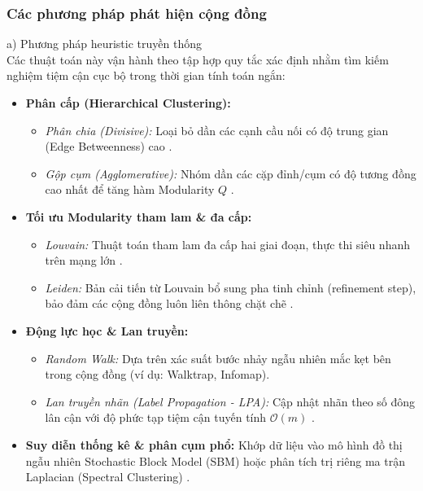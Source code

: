 \documentclass[14pt,a4paper]{extarticle}
\begin{document}
\subsubsection{Các phương pháp phát hiện cộng đồng}

\noindent a) Phương pháp heuristic truyền thống \\ \indent
Các thuật toán này vận hành theo tập hợp quy tắc xác định nhằm tìm kiếm nghiệm tiệm cận cục bộ trong thời gian tính toán ngắn:
\begin{itemize}
    \item \textbf{Phân cấp (Hierarchical Clustering):}
    \begin{itemize}
        \item \textit{Phân chia (Divisive):} Loại bỏ dần các cạnh cầu nối có độ trung gian (Edge Betweenness) cao \cite{Bedi2016}.
        \item \textit{Gộp cụm (Agglomerative):} Nhóm dần các cặp đỉnh/cụm có độ tương đồng cao nhất để tăng hàm Modularity $Q$ \cite{Traag2014}.
    \end{itemize}
    
    \item \textbf{Tối ưu Modularity tham lam \& đa cấp:}
    \begin{itemize}
        \item \textit{Louvain:} Thuật toán tham lam đa cấp hai giai đoạn, thực thi siêu nhanh trên mạng lớn \cite{Baraa2021}.
        \item \textit{Leiden:} Bản cải tiến từ Louvain bổ sung pha tinh chỉnh (refinement step), bảo đảm các cộng đồng luôn liên thông chặt chẽ \cite{Pourabbasi2022}.
    \end{itemize}
    
    \item \textbf{Động lực học \& Lan truyền:}
    \begin{itemize}
        \item \textit{Random Walk:} Dựa trên xác suất bước nhảy ngẫu nhiên mắc kẹt bên trong cộng đồng (ví dụ: Walktrap, Infomap).
        \item \textit{Lan truyền nhãn (Label Propagation - LPA):} Cập nhật nhãn theo số đông lân cận với độ phức tạp tiệm cận tuyến tính $\mathcal{O}(m)$ \cite{Gong2016}.
    \end{itemize}
    
    \item \textbf{Suy diễn thống kê \& phân cụm phổ:} Khớp dữ liệu vào mô hình đồ thị ngẫu nhiên Stochastic Block Model (SBM) \cite{Baraa2021} hoặc phân tích trị riêng ma trận Laplacian (Spectral Clustering) \cite{Chen2019}.
\end{itemize}
\end{document}
